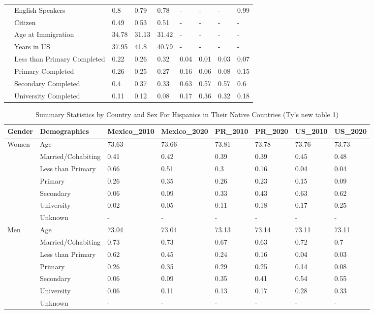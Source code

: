 \documentclass[
]{article}
\begin{document}
\begin{landscape}
\begin{table}[ht]
\begin{tabular}{l|l|p{1.5cm}p{1.5cm}p{1.5cm}p{1.5cm}p{1.5cm}p{1.5cm}p{1.5cm}}
   & English Speakers & 0.8 & 0.79 & 0.78 & - & - & - & 0.99 \\ 
   & Citizen & 0.49 & 0.53 & 0.51 & - & - & - & - \\ 
   & Age at Immigration & 34.78 & 31.13 & 31.42 & - & - & - & - \\ 
   & Years in US & 37.95 & 41.8 & 40.79 & - & - & - & - \\ 
   & Less than Primary Completed & 0.22 & 0.26 & 0.32 & 0.04 & 0.01 & 0.03 & 0.07 \\ 
   & Primary Completed & 0.26 & 0.25 & 0.27 & 0.16 & 0.06 & 0.08 & 0.15 \\ 
   & Secondary Completed & 0.4 & 0.37 & 0.33 & 0.63 & 0.57 & 0.57 & 0.6 \\ 
   & University Completed & 0.11 & 0.12 & 0.08 & 0.17 & 0.36 & 0.32 & 0.18 \\ 
   \hline
\end{tabular}
\endgroup
\end{table}


\begin{table}[ht]
\centering
\caption{Summary Statistics by Country and Sex For Hispanics in Their Native Countries  (Ty's new table 1)} 
\begin{tabular}{l|l|llllll}
  \hline
Gender & Demographics & Mexico\_2010 & Mexico\_2020 & PR\_2010 & PR\_2020 & US\_2010 & US\_2020 \\ 
  \hline
Women & Age & 73.63 & 73.66 & 73.81 & 73.78 & 73.76 & 73.73 \\ 
   & Married/Cohabiting & 0.41 & 0.42 & 0.39 & 0.39 & 0.45 & 0.48 \\ 
   & Less than Primary & 0.66 & 0.51 & 0.3 & 0.16 & 0.04 & 0.04 \\ 
   & Primary & 0.26 & 0.35 & 0.26 & 0.23 & 0.15 & 0.09 \\ 
   & Secondary & 0.06 & 0.09 & 0.33 & 0.43 & 0.63 & 0.62 \\ 
   & University & 0.02 & 0.05 & 0.11 & 0.18 & 0.17 & 0.25 \\ 
   & Unknown & - & - & - & - & - & - \\ 
  Men & Age & 73.04 & 73.04 & 73.13 & 73.14 & 73.11 & 73.11 \\ 
   & Married/Cohabiting & 0.73 & 0.73 & 0.67 & 0.63 & 0.72 & 0.7 \\ 
   & Less than Primary & 0.62 & 0.45 & 0.24 & 0.16 & 0.04 & 0.03 \\ 
   & Primary & 0.26 & 0.35 & 0.29 & 0.25 & 0.14 & 0.08 \\ 
   & Secondary & 0.06 & 0.09 & 0.35 & 0.41 & 0.54 & 0.55 \\ 
   & University & 0.06 & 0.11 & 0.13 & 0.17 & 0.28 & 0.33 \\ 
   & Unknown & - & - & - & - & - & - \\ 
   \hline
\end{tabular}
\end{table}

\end{landscape}
\end{document}
